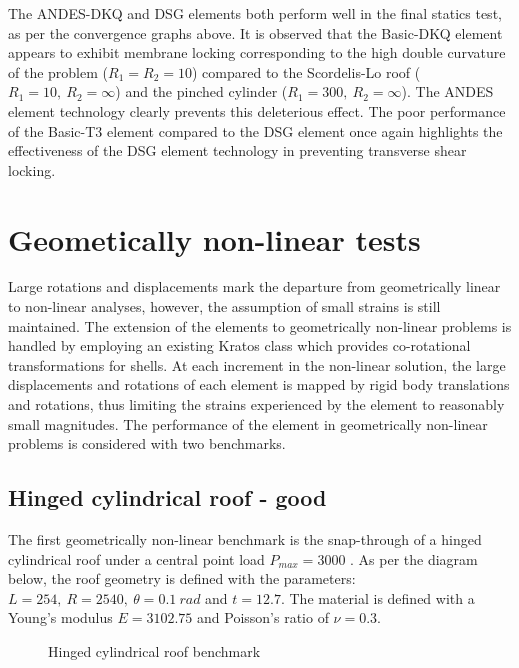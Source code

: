 The ANDES-DKQ and DSG elements both perform well in the final statics test, as per the convergence graphs above. It is observed that the Basic-DKQ element appears to exhibit membrane locking corresponding to the high double curvature of the problem ($R_1=R_2 = 10$) compared to the Scordelis-Lo roof ($R_1= 10,\ R_2 = \infty$) and the pinched cylinder ($R_1= 300,\ R_2 = \infty$). The ANDES element technology clearly prevents this deleterious effect. The poor performance of the Basic-T3 element compared to the DSG element once again highlights the effectiveness of the DSG element technology in preventing transverse shear locking.
\newpage
\section{Geometically non-linear tests}

Large rotations and displacements mark the departure from geometrically linear to non-linear analyses, however, the assumption of small strains is still maintained. The extension of the elements to geometrically non-linear problems is handled by employing an existing Kratos class which provides co-rotational transformations for shells. At each increment in the non-linear solution, the large displacements and rotations of each element is mapped by rigid body translations and rotations, thus limiting the strains experienced by the element to reasonably small magnitudes. The performance of the element in geometrically non-linear problems is considered with two benchmarks.

\subsection{Hinged cylindrical roof - good}

The first geometrically non-linear benchmark is the snap-through of a hinged cylindrical roof under a central point load $P_{max} = 3000$ \cite{Sze2004}. As per the diagram below, the roof geometry is defined with the parameters: $L = 254,\ R = 2540,\ \theta=0.1\ rad$ and $t = 12.7$. The material is defined with a Young's modulus $E = 3102.75$ and Poisson's ratio of $\nu = 0.3$.

 
\begin{figure}[H]
	\caption{\label{ref_label_overall}Hinged cylindrical roof benchmark}
\end{figure}

